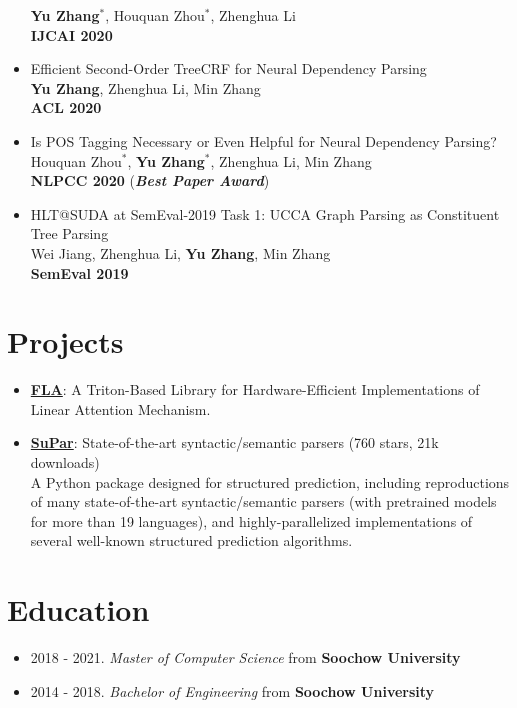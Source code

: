 \documentclass[a4paper,12pt]{article}
\begin{document}
\begin{itemize}[leftmargin=18pt]
    \textbf{Yu Zhang$^*$}, Houquan Zhou$^*$, Zhenghua Li\\
    \textbf{IJCAI 2020}
\item Efficient Second-Order TreeCRF for Neural Dependency Parsing\\
    \textbf{Yu Zhang}, Zhenghua Li, Min Zhang\\
    \textbf{ACL 2020}
\item Is POS Tagging Necessary or Even Helpful for Neural Dependency Parsing?\\
    Houquan Zhou$^*$, \textbf{Yu Zhang$^*$}, Zhenghua Li, Min Zhang\\
    \textbf{NLPCC 2020} (\textbf{\emph{\textcolor{brickred}{Best Paper Award}}})
\item HLT@SUDA at SemEval-2019 Task 1: UCCA Graph Parsing as Constituent Tree Parsing\\
    Wei Jiang, Zhenghua Li, \textbf{Yu Zhang}, Min Zhang\\
    \textbf{SemEval 2019}
\end{itemize}

\section{Projects}
\begin{itemize}[leftmargin=18pt]
\item \href{https://github.com/sustcsonglin/flash-linear-attention}{\textbf{FLA}}: A Triton-Based Library for Hardware-Efficient Implementations of Linear Attention Mechanism.
\item \href{https://github.com/yzhangcs/parser}{\textbf{SuPar}}: State-of-the-art syntactic/semantic parsers (760 stars, 21k downloads)\\
    A Python package designed for structured prediction, including reproductions of many state-of-the-art syntactic/semantic parsers (with pretrained models for more than 19 languages), and highly-parallelized implementations of several well-known structured prediction algorithms.
\end{itemize}

\section{Education}
\begin{itemize}[leftmargin=18pt]
\item 2018 - 2021. \emph{Master of Computer Science} from \textbf{Soochow University} 
\item 2014 - 2018. \emph{Bachelor of Engineering} from \textbf{Soochow University} 
\end{itemize}
\end{document}
